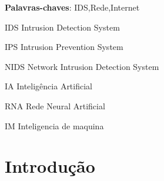 \documentclass[
	12pt,				%
	openright,			%
	oneside,
	a4paper,			%
	english,			%
	french,				%
	spanish,			%
	brazil				%
	]{abntex2}
\begin{document}
\frenchspacing 


\imprimircapa

\imprimirfolhaderosto%


\setlength{\absparsep}{18pt} %
\begin{resumo}
   
 \textbf{Palavras-chaves}: IDS,Rede,Internet
\end{resumo}



\begin{siglas}
  \item[IDS] Intrusion Detection System
  \item[IPS] Intrusion Prevention System
  \item[NIDS] Network Intrusion Detection System
  \item[IA] Inteligência Artificial
  \item[RNA] Rede Neural Artificial
  \item[IM] Inteligencia de maquina	
\end{siglas}

\tableofcontents*
\cleardoublepage

\textual

\chapter[Introdução]{Introdução}
\end{document}
